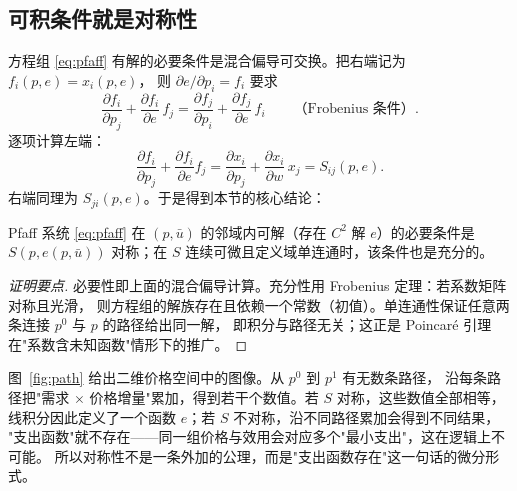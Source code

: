 \subsection{可积条件就是对称性}

方程组 \eqref{eq:pfaff} 有解的必要条件是混合偏导可交换。把右端记为 $f_i(p,e)=x_i(p,e)$，
则 $\partial e/\partial p_i=f_i$ 要求
\[
 \frac{\partial f_i}{\partial p_j}+\frac{\partial f_i}{\partial e}\,f_j
 =\frac{\partial f_j}{\partial p_i}+\frac{\partial f_j}{\partial e}\,f_i
 \qquad\text{（Frobenius 条件）}.
\]
逐项计算左端：
\[
 \frac{\partial f_i}{\partial p_j}+\frac{\partial f_i}{\partial e}f_j
 =\frac{\partial x_i}{\partial p_j}+\frac{\partial x_i}{\partial w}\,x_j
 =S_{ij}(p,e).
\]
右端同理为 $S_{ji}(p,e)$。于是得到本节的核心结论：

\begin{proposition}[可积条件 $=$ 对称性]\label{prop:frobenius}
Pfaff 系统 \eqref{eq:pfaff} 在 $(p,\bar u)$ 的邻域内可解（存在 $C^2$ 解 $e$）的必要条件是
$S(p,e(p,\bar u))$ 对称；在 $S$ 连续可微且定义域单连通时，该条件也是充分的。
\end{proposition}

\begin{proof}[证明要点]
必要性即上面的混合偏导计算。充分性用 Frobenius 定理：若系数矩阵对称且光滑，
则方程组的解族存在且依赖一个常数（初值）。单连通性保证任意两条连接 $p^0$ 与 $p$ 的路径给出同一解，
即积分与路径无关；这正是 Poincaré 引理在"系数含未知函数"情形下的推广。
\end{proof}

\begin{remark}
图~\ref{fig:path} 给出二维价格空间中的图像。从 $p^0$ 到 $p^1$ 有无数条路径，
沿每条路径把"需求 $\times$ 价格增量"累加，得到若干个数值。若 $S$ 对称，这些数值全部相等，
线积分因此定义了一个函数 $e$；若 $S$ 不对称，沿不同路径累加会得到不同结果，
"支出函数"就不存在——同一组价格与效用会对应多个"最小支出"，这在逻辑上不可能。
所以对称性不是一条外加的公理，而是"支出函数存在"这一句话的微分形式。
\end{remark}

